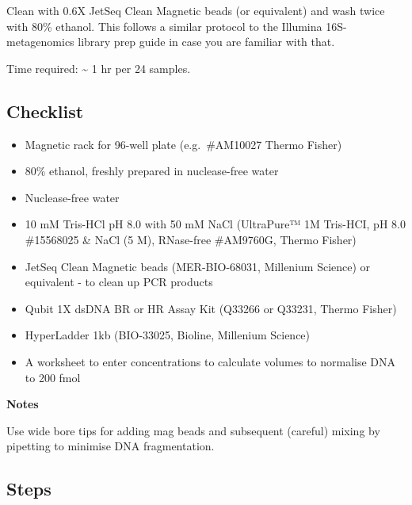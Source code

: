 \documentclass[
]{book}
\providecommand{\tightlist}{%
  \setlength{\itemsep}{0pt}\setlength{\parskip}{0pt}}
\begin{document}
Clean with 0.6X JetSeq Clean Magnetic beads (or equivalent) and wash twice with 80\% ethanol. This follows a similar protocol to the Illumina 16S-metagenomics library prep guide in case you are familiar with that.

Time required: \textasciitilde{} 1 hr per 24 samples.

\subsection{Checklist}\label{checklist-2}

\begin{itemize}
\tightlist
\item
  Magnetic rack for 96-well plate (e.g.~\#AM10027 Thermo Fisher)
\item
  80\% ethanol, freshly prepared in nuclease-free water
\item
  Nuclease-free water
\item
  10 mM Tris-HCl pH 8.0 with 50 mM NaCl (UltraPure™ 1M Tris-HCI, pH 8.0 \#15568025 \& NaCl (5 M), RNase-free \#AM9760G, Thermo Fisher)
\item
  JetSeq Clean Magnetic beads (MER-BIO-68031, Millenium Science) or equivalent - to clean up PCR products
\item
  Qubit 1X dsDNA BR or HR Assay Kit (Q33266 or Q33231, Thermo Fisher)
\item
  HyperLadder 1kb (BIO-33025, Bioline, Millenium Science)
\item
  A worksheet to enter concentrations to calculate volumes to normalise DNA to 200 fmol
\end{itemize}

\textbf{Notes}

Use wide bore tips for adding mag beads and subsequent (careful) mixing by pipetting to minimise DNA fragmentation.

\subsection{Steps}\label{steps-1}
\end{document}
